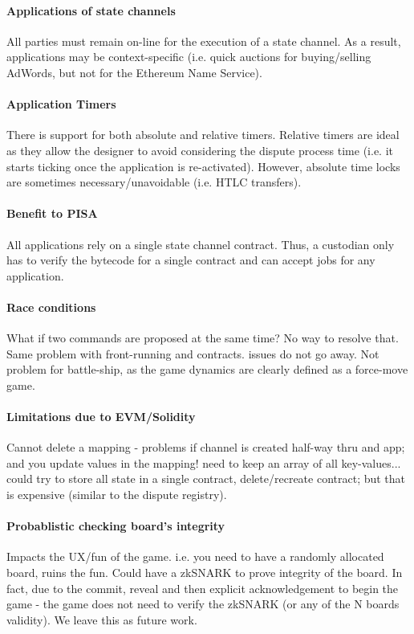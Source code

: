 \documentclass{llncs}
\begin{document}
\paragraph{Applications of state channels} All parties must remain on-line for the execution of a state channel. As a result, applications may be context-specific (i.e. quick auctions for buying/selling AdWords, but not for the Ethereum Name Service). 

\paragraph{Application Timers} There is support for both absolute and relative timers. Relative timers are ideal as they allow the designer to avoid considering the dispute process time (i.e. it starts ticking once the application is re-activated). However, absolute time locks are sometimes necessary/unavoidable (i.e. HTLC transfers). 

\paragraph{Benefit to PISA} All applications rely on a single state channel contract. Thus, a custodian only has to verify the bytecode for a single contract and can accept jobs for any application. 

\paragraph{Race conditions} What if two commands are proposed at the same time? No way to resolve that. Same problem with front-running and contracts. issues do not go away. Not problem for battle-ship, as the game dynamics are clearly defined as a force-move game. 

\paragraph{Limitations due to EVM/Solidity} Cannot delete a mapping - problems if channel is created half-way thru and app; and you update values in the mapping! need to keep an array of all key-values... could try to store all state in a single contract, delete/recreate contract; but that is expensive (similar to the dispute registry).  

\paragraph{Probablistic checking board's integrity} Impacts the UX/fun of the game. i.e. you need to have a randomly allocated board, ruins the fun. Could have a zkSNARK to prove integrity of the board. In fact, due to the commit, reveal and then explicit acknowledgement to begin the game - the game does not need to verify the zkSNARK (or any of the N boards validity). We leave this as future work.  
\end{document}
